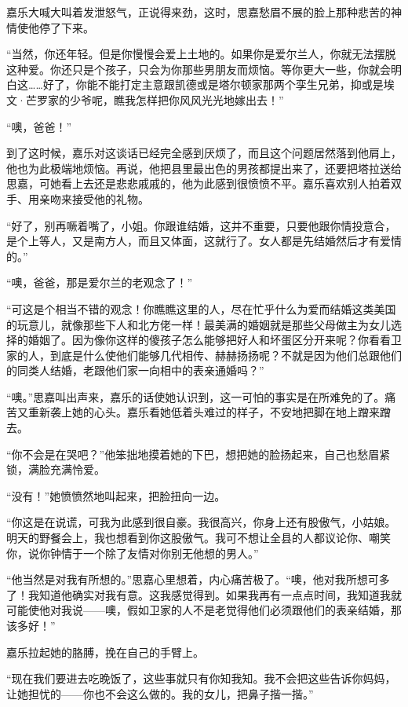 \par 嘉乐大喊大叫着发泄怒气，正说得来劲，这时，思嘉愁眉不展的脸上那种悲苦的神情使他停了下来。
\par “当然，你还年轻。但是你慢慢会爱上土地的。如果你是爱尔兰人，你就无法摆脱这种爱。你还只是个孩子，只会为你那些男朋友而烦恼。等你更大一些，你就会明白这……好了，你能不能打定主意跟凯德或是塔尔顿家那两个孪生兄弟，抑或是埃文·芒罗家的少爷呢，瞧我怎样把你风风光光地嫁出去！”
\par “噢，爸爸！”
\par 到了这时候，嘉乐对这谈话已经完全感到厌烦了，而且这个问题居然落到他肩上，他也为此极端地烦恼。再说，他把县里最出色的男孩都提出来了，还要把塔拉送给思嘉，可她看上去还是悲悲戚戚的，他为此感到很愤愤不平。嘉乐喜欢别人拍着双手、用亲吻来接受他的礼物。
\par “好了，别再噘着嘴了，小姐。你跟谁结婚，这并不重要，只要他跟你情投意合，是个上等人，又是南方人，而且又体面，这就行了。女人都是先结婚然后才有爱情的。”
\par “噢，爸爸，那是爱尔兰的老观念了！”
\par “可这是个相当不错的观念！你瞧瞧这里的人，尽在忙乎什么为爱而结婚这类美国的玩意儿，就像那些下人和北方佬一样！最美满的婚姻就是那些父母做主为女儿选择的婚姻了。因为像你这样的傻孩子怎么能够把好人和坏蛋区分开来呢？你看看卫家的人，到底是什么使他们能够几代相传、赫赫扬扬呢？不就是因为他们总跟他们的同类人结婚，老跟他们家一向相中的表亲通婚吗？”
\par “噢。”思嘉叫出声来，嘉乐的话使她认识到，这一可怕的事实是在所难免的了。痛苦又重新袭上她的心头。嘉乐看她低着头难过的样子，不安地把脚在地上蹭来蹭去。
\par “你不会是在哭吧？”他笨拙地摸着她的下巴，想把她的脸扬起来，自己也愁眉紧锁，满脸充满怜爱。
\par “没有！”她愤愤然地叫起来，把脸扭向一边。
\par “你这是在说谎，可我为此感到很自豪。我很高兴，你身上还有股傲气，小姑娘。明天的野餐会上，我也想看到你这股傲气。我可不想让全县的人都议论你、嘲笑你，说你钟情于一个除了友情对你别无他想的男人。”
\par “他当然是对我有所想的。”思嘉心里想着，内心痛苦极了。“噢，他对我所想可多了！我知道他确实对我有意。这我感觉得到。如果我再有一点点时间，我知道我就可能使他对我说——噢，假如卫家的人不是老觉得他们必须跟他们的表亲结婚，那该多好！”
\par 嘉乐拉起她的胳膊，挽在自己的手臂上。
\par “现在我们要进去吃晚饭了，这些事就只有你知我知。我不会把这些告诉你妈妈，让她担忧的——你也不会这么做的。我的女儿，把鼻子揩一揩。”
